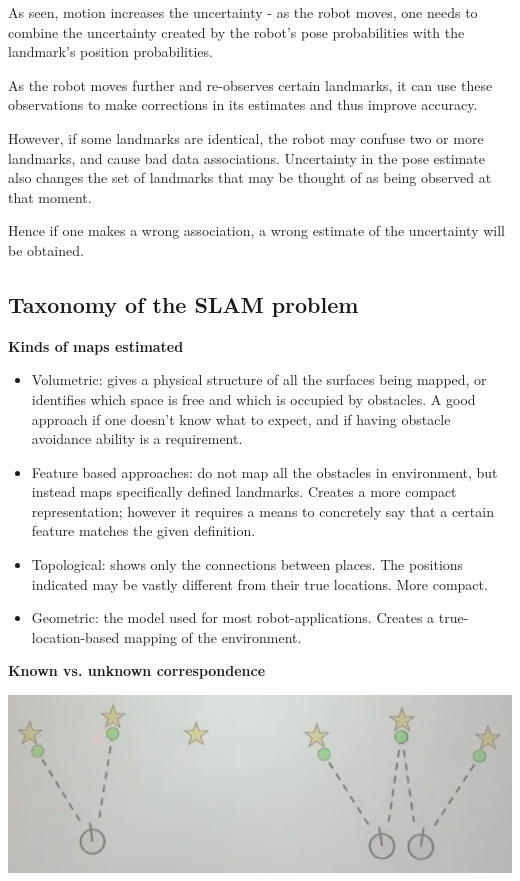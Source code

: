 \documentclass[a4paper]{article}
\begin{document}
As seen, motion increases the uncertainty - as the robot moves, one needs to combine the uncertainty created by the robot's pose probabilities with the landmark's position probabilities.

As the robot moves further and re-observes certain landmarks, it can use these observations to make corrections in its estimates and thus improve accuracy.

However, if some landmarks are identical, the robot may confuse two or more landmarks, and cause bad data associations. Uncertainty in the pose estimate also changes the set of landmarks that may be thought of as being observed at that moment.

Hence if one makes a wrong association, a wrong estimate of the uncertainty will be obtained.

\subsection{Taxonomy of the SLAM problem}

\textbf{Kinds of maps estimated}

\begin{itemize}
    \item Volumetric: gives a physical structure of all the surfaces being mapped, or identifies which space is free and which is occupied by obstacles. A good approach if one doesn't know what to expect, and if having obstacle avoidance ability is a requirement.
    \item Feature based approaches: do not map all the obstacles in environment, but instead maps specifically defined landmarks. Creates a more compact representation; however it requires a means to concretely say that a certain feature matches the given definition.
\end{itemize}

\begin{itemize}
    \item Topological: shows only the connections between places. The positions indicated may be vastly different from their true locations. More compact.
    \item Geometric: the model used for most robot-applications. Creates a true-location-based mapping of the environment.
\end{itemize}

\textbf{Known vs. unknown correspondence}

\begin{center}
\includegraphics[scale=0.5]{ukcorresp}
\end{center}
\end{document}
